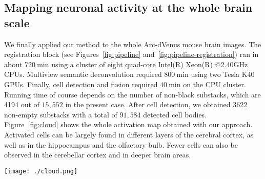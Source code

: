 \documentclass[smallextended]{svjour3}       %
\begin{document}
\subsection{Mapping neuronal activity at the whole brain scale}
\label{sec:mapping}
We finally applied our method to the whole Arc-dVenus mouse brain
images. The registration block (see Figures~\ref{fig:pipeline}
and~\ref{fig:pipeline-registration}) ran in about $\SI{720}{\minute}$
using a cluster of eight quad-core Intel(R) Xeon(R) @2.40GHz
CPUs. Multiview semantic deconvolution required $\SI{800}{\minute}$
using two Tesla K40 GPUs. Finally, cell detection and fusion
required $\SI{40}{\minute}$ on the CPU cluster. Running time of course
depends on the number of non-black substacks, which are 4194 out of
$15,552$ in the present case.
After cell detection, we obtained 3622 non-empty substacks with a total of
$91,584$ detected cell bodies. Figure~\ref{fig:cloud} shows the whole
activation map obtained with our approach. Activated cells can be largely found in different layers of the cerebral
cortex, as well as in the hippocampus and the olfactory bulb. Fewer cells can also be observed in the cerebellar
cortex and in deeper brain areas.


\begin{figure*}
  \centering
  \texttt{[image: ./cloud.png]}
  \caption{Point cloud showing a whole-brain activation map. $91,584$
    active cells have been detected by the software.}
  \label{fig:cloud}
\end{figure*}
\end{document}
